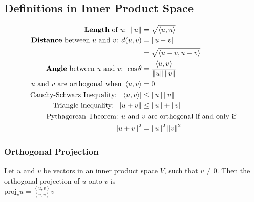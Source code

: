 \documentclass[]{article}
\begin{document}
\subsection{Definitions in Inner Product Space}
\begin{align*}
	\text{\textbf{Length} of $u$: } \left\| u\right\| &= 
		\sqrt{\left\langle u,u \right\rangle} \\
	\text{\textbf{Distance} between $u$ and $v$: } d(u,v) &=
		\left\| u-v \right\|  \\ &= 
		\sqrt{\left\langle u-v,u-v \right\rangle} \\
	\text{\textbf{Angle} between $u$ and $v$: } \cos\theta &= 
		\frac{\left\langle u,v \right\rangle}
			{\left\| u\right\| \left\| v\right\|} \\
	\text{$u$ and $v$ are orthogonal when }\left\langle u,v\right\rangle &=0 \\
	\text{Cauchy-Schwarz Inequality: } 
		\left| \left\langle u,v \right\rangle \right| &\leq
		\left\| u\right\| \left\| v\right\| \\
	\text{Triangle inequality: } \left\| u + v\right\| &\leq
		\left\| u\right\| + \left\| v\right\| \\
	\text{Pythagorean Theorem: $u$ and }&
	\text{$v$ are orthogonal if and only if} \\
		\left\| u + v\right\|^2 &= \left\| u\right\|^2 \left\| v\right\|^2 \\
\end{align*}

\subsubsection{Orthogonal Projection}
Let $u$ and $v$ be vectors in an inner product space $V$, such that $v \neq 0$.
Then the orthogonal projection of $u$ onto $v$ is \\
$\text{proj}_vu = \frac
	{\left\langle u,v \right\rangle}
	{\left\langle v,v \right\rangle}
v $
\end{document}

